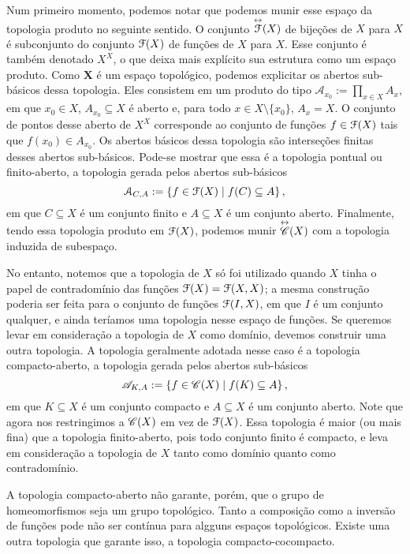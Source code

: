Num primeiro momento, podemos notar que podemos munir esse espaço da topologia produto no seguinte sentido. O conjunto $\overset{\leftrightarrow}{\mathcal{F}}(X)$ de bijeções de $X$ para $X$ é subconjunto do conjunto $\mathcal{F}(X)$ de funções de $X$ para $X$. Esse conjunto é também denotado $X^X$, o que deixa mais explícito sua estrutura como um espaço produto. Como $\bm X$ é um espaço topológico, podemos explicitar os abertos sub-básicos dessa topologia. Eles consistem em um produto do tipo $\mathcal A_{x_0} := \prod_{x \in X} A_x$, em que $x_0 \in X$, $A_{x_0} \subseteq X$ é aberto e, para todo $x \in X \setminus \{x_0\}$, $A_x = X$. O conjunto de pontos desse aberto de $X^X$ corresponde ao conjunto de funções $f \in \mathcal{F}(X)$ tais que $f(x_0) \in A_{x_0}$. Os abertos básicos dessa topologia são interseções finitas desses abertos sub-básicos. Pode-se mostrar que essa é a topologia pontual ou finito-aberto, a topologia gerada pelos abertos sub-básicos
	\begin{equation*}
	\mathcal A_{C,A} := \left\{{f \in \mathcal{F}(X)}\;\middle\vert\;{f(C) \subseteq A}\right\},
	\end{equation*}
em que $C \subseteq X$ é um conjunto finito e $A \subseteq X$ é um conjunto aberto. Finalmente, tendo essa topologia produto em $\mathcal{F}(X)$, podemos munir $\overset{\leftrightarrow}{\mathscr{C}}(X)$ com a topologia induzida de subespaço.

No entanto, notemos que a topologia de $X$ só foi utilizado quando $X$ tinha o papel de contradomínio das funções $\mathcal{F}(X)=\mathcal{F}(X,X)$; a mesma construção poderia ser feita para o conjunto de funções $\mathcal{F}(I,X)$, em que $I$ é um conjunto qualquer, e ainda teríamos uma topologia nesse espaço de funções. Se queremos levar em consideração a topologia de $X$ como domínio, devemos construir uma outra topologia. A topologia geralmente adotada nesse caso é a topologia compacto-aberto, a topologia gerada pelos abertos sub-básicos
	\begin{equation*}
	\mathscr A_{K,A} := \left\{{f \in \mathscr{C}(X)}\;\middle\vert\;{f(K) \subseteq A}\right\},
	\end{equation*}
em que $K \subseteq X$ é um conjunto compacto e $A \subseteq X$ é um conjunto aberto. Note que agora nos restringimos a $\mathscr{C}(X)$ em vez de $\mathcal{F}(X)$. Essa topologia é maior (ou mais fina) que a topologia finito-aberto, pois todo conjunto finito é compacto, e leva em consideração a topologia de $X$ tanto como domínio quanto como contradomínio.

A topologia compacto-aberto não garante, porém, que o grupo de homeomorfismos seja um grupo topológico. Tanto a composição como a inversão de funções pode não ser contínua para algguns espaços topológicos. Existe uma outra topologia que garante isso, a topologia compacto-cocompacto.

